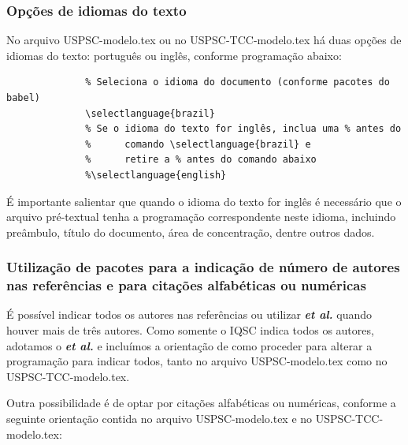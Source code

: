 \subsubsection{Opções de idiomas do texto}\label{idioma} 
No arquivo USPSC-modelo.tex ou no USPSC-TCC-modelo.tex há duas opções de idiomas do texto: português ou inglês, conforme programação abaixo:			  
			  \begin{verbatim}
			  % Seleciona o idioma do documento (conforme pacotes do babel)
			  \selectlanguage{brazil}
			  % Se o idioma do texto for inglês, inclua uma % antes do 
			  %      comando \selectlanguage{brazil} e 
			  %      retire a % antes do comando abaixo
			  %\selectlanguage{english}			  
			  \end{verbatim}
É importante salientar que quando o idioma do texto for inglês é necessário que o arquivo pré-textual tenha a programação correspondente neste idioma, incluindo preâmbulo, título do documento, área de concentração, dentre outros dados.
 			  
\subsubsection{Utilização de pacotes para a indicação de número de autores nas referências e para citações alfabéticas ou numéricas}
É possível indicar todos os autores nas referências ou utilizar \textbf{\textit{et al.}} quando houver mais de três autores. Como somente o IQSC indica todos os autores, adotamos o \textbf{\textit{et al.}} e incluímos a orientação de como proceder para alterar a programação para indicar todos, tanto no arquivo USPSC-modelo.tex como no USPSC-TCC-modelo.tex.

Outra possibilidade é de optar por citações alfabéticas ou numéricas, conforme a seguinte orientação contida no arquivo USPSC-modelo.tex e no USPSC-TCC-modelo.tex:	
		  
